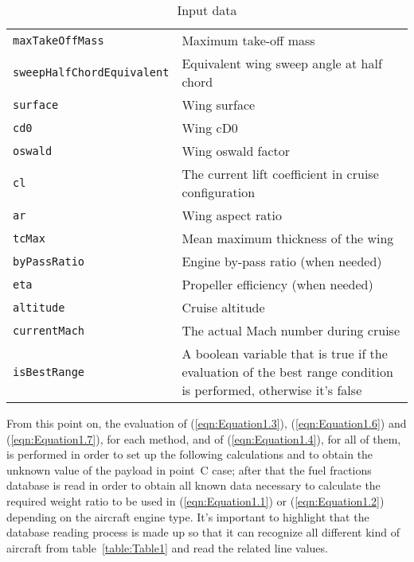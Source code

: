\begin{table}[!ht]
\begin{tabular}{p{7cm}p{7.5cm}}
\toprule
\lstinline[language=Java]!maxTakeOffMass! & Maximum take-off mass \\[0.1	cm]
\lstinline[language=Java]!sweepHalfChordEquivalent! & Equivalent wing sweep angle at half chord \\[0.1cm]
\lstinline[language=Java]!surface! & Wing surface \\[0.1cm]
\lstinline[language=Java]!cd0!	& Wing cD0 \\[0.1cm]
\lstinline[language=Java]!oswald!	& Wing oswald factor \\[0.1cm]
\lstinline[language=Java]!cl!	& The current lift coefficient in cruise configuration \\[0.1cm]
\lstinline[language=Java]!ar!	& Wing aspect ratio \\[0.1cm]
\lstinline[language=Java]!tcMax! & Mean maximum thickness of the wing \\[0.1cm]
\lstinline[language=Java]!byPassRatio! & Engine by-pass ratio (when needed) \\[0.1cm]
\lstinline[language=Java]!eta! & Propeller efficiency (when needed) \\[0.1cm]
\lstinline[language=Java]!altitude! & Cruise altitude \\[0.1cm]
\lstinline[language=Java]!currentMach! & The actual Mach number during cruise \\[0.1cm]
\lstinline[language=Java]!isBestRange! & A boolean variable that is true if the evaluation of the best range condition is performed, otherwise it's false         \\
\bottomrule
\end{tabular}
\caption{Input data}
\label{table:Table2}
\end{table}

From this point on, the evaluation of (\ref{eqn:Equation1.3}), (\ref{eqn:Equation1.6}) and (\ref{eqn:Equation1.7}), for each method, and of (\ref{eqn:Equation1.4}), for all of them, is performed in order to set up the following calculations and to obtain the unknown value of the payload in point~C case; after that the fuel fractions database is read in order to obtain all known data necessary to calculate the required weight ratio to be used in (\ref{eqn:Equation1.1}) or (\ref{eqn:Equation1.2}) depending on the aircraft engine type. It’s important to highlight that the database reading process is made up so that it can recognize all different kind of aircraft from table~\ref{table:Table1} and read the related line values.

